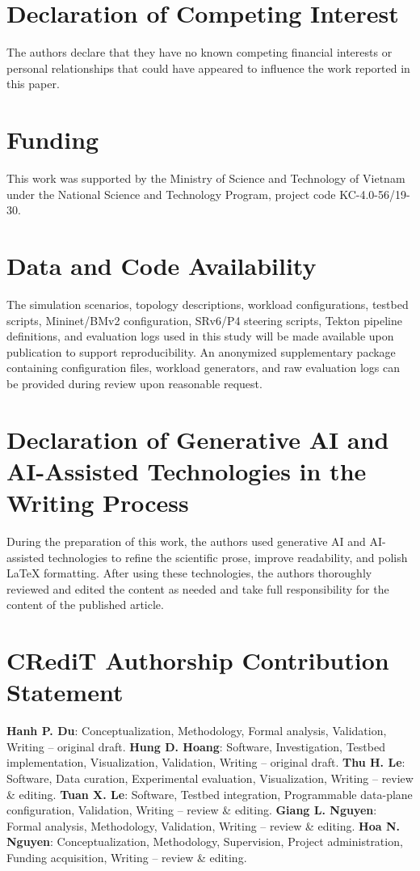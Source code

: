 \documentclass[final,5p]{elsarticle}
\begin{document}
\section*{Declaration of Competing Interest}
\noindent The authors declare that they have no known competing financial interests or personal relationships that could have appeared to influence the work reported in this paper.


\section*{Funding}
This work was supported by the Ministry of Science and Technology of Vietnam under the National Science and Technology Program, project code KC-4.0-56/19-30.

\section*{Data and Code Availability}
The simulation scenarios, topology descriptions, workload configurations, testbed scripts, Mininet/BMv2 configuration, SRv6/P4 steering scripts, Tekton pipeline definitions, and evaluation logs used in this study will be made available upon publication to support reproducibility. An anonymized supplementary package containing configuration files, workload generators, and raw evaluation logs can be provided during review upon reasonable request.

\section*{Declaration of Generative AI and AI-Assisted Technologies in the Writing Process}
During the preparation of this work, the authors used generative AI and AI-assisted technologies to refine the scientific prose, improve readability, and polish LaTeX formatting. After using these technologies, the authors thoroughly reviewed and edited the content as needed and take full responsibility for the content of the published article.

\section*{CRediT Authorship Contribution Statement}
\textbf{Hanh P. Du}: Conceptualization, Methodology, Formal analysis, Validation, Writing -- original draft.
\textbf{Hung D. Hoang}: Software, Investigation, Testbed implementation, Visualization, Validation, Writing -- original draft.
\textbf{Thu H. Le}: Software, Data curation, Experimental evaluation, Visualization, Writing -- review \& editing.
\textbf{Tuan X. Le}: Software, Testbed integration, Programmable data-plane configuration, Validation, Writing -- review \& editing.
\textbf{Giang L. Nguyen}: Formal analysis, Methodology, Validation, Writing -- review \& editing.
\textbf{Hoa N. Nguyen}: Conceptualization, Methodology, Supervision, Project administration, Funding acquisition, Writing -- review \& editing.




\end{document}
